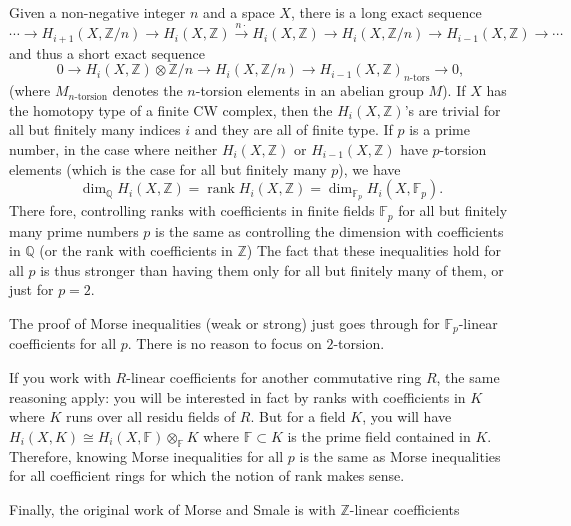\documentclass[a4paper]{article}
\newcommand\Z{\mathbb Z}
\newcommand\Q{\mathbb Q}
\newcommand\F{\mathbb F}
\DeclareMathOperator{\rank}{rank}
\begin{document}
Given a non-negative integer $n$ and a space $X$, there is a long exact sequence
 \[
     \cdots \to  H_{i+1}(X, \Z / n) \to  H_i(X, \Z) \xrightarrow{n \cdot}  H_i(X, \Z) \to  H_i(X, \Z / n) \to  H_{i-1}(X, \Z) \to  \cdots
\] 
and thus a short exact sequence
\[
    0 \to  H_i(X, \Z) \otimes \Z / n \to  H_i(X, \Z / n) \to  H_{i-1}(X, \Z)_\text{$n$-tors}  \to  0
,\] 
(where $M_{\text{$n$-torsion}}$ denotes the $n$-torsion elements in an abelian group $M$).
If $X$ has the homotopy type of a finite CW complex, then the $H_i(X, \Z)$'s are trivial for all but finitely many indices $i$ and they are all of finite type. If  $p$ is a prime number, in the case where neither  $H_i(X, \Z)$ or $H_{i-1}(X, \Z)$ have $p$-torsion elements (which is the case for all but finitely many $p$), we have
\[
    \dim_{\Q} H_i(X, \Z) = \rank H_i(X, \Z) = \dim_{\F_p }H_i(X, \F_p)
.\] 
There fore, controlling ranks with coefficients in finite fields $\F_p$ for all but finitely many prime numbers  $p$ is the same as controlling the dimension with coefficients in  $\Q$ (or the rank with coefficients in $\Z$)
The fact that these inequalities hold for all $p$ is thus stronger than having them only for all but finitely many of them, or just for  $p = 2$.

The proof of Morse inequalities (weak or strong) just goes through for  $\F_p$-linear coefficients for all  $p$. There is no reason to focus on  $2$-torsion.

If you work with $R$-linear coefficients for another commutative ring $R$, the same reasoning apply: you will be interested in fact by ranks with coefficients in  $K$ where  $K$ runs over all residu fields of  $R$. But for a field  $K$, you will have  $H_i(X, K) \cong H_i(X, \F) \otimes_\F K$ where $\F \subset K$ is the prime field contained in $K$. Therefore, knowing Morse inequalities for all  $p$ is the same as Morse inequalities for all coefficient rings for which the notion of rank makes sense.

Finally, the original work of Morse and Smale is with  $\Z$-linear coefficients
\end{document}

